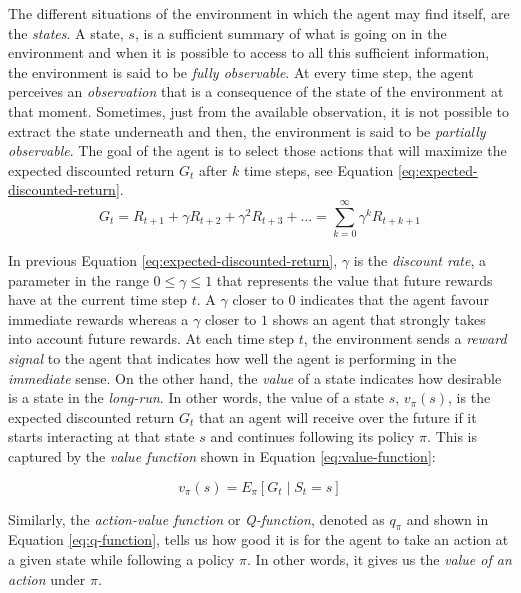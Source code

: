 The different situations of the environment in which the agent may find itself, are the \textit{states}. A state, $s$, is a sufficient summary of what is going on in the environment and when it is possible to access to all this sufficient information, the environment is said to be \textit{fully observable}. At every time step, the agent perceives an \textit{observation} that is a consequence of the state of the environment at that moment. Sometimes, just from the available observation, it is not possible to extract the state underneath and then, the environment is said to be \textit{partially observable}. The goal of the agent is to select those actions that will maximize the expected discounted return $G_t$ after $k$ time steps, see Equation \eqref{eq:expected-discounted-return}.
\begin{equation}
G_t = R_{t+1} + \gamma R_{t+2} + \gamma^2 R_{t+3} +... = \sum_{k=0}^{\infty} \gamma ^k R_{t+k+1}
\label{eq:expected-discounted-return}
\end{equation}

In previous Equation \eqref{eq:expected-discounted-return}, $\gamma$ is the \textit{discount rate}, a parameter in the range $0 \leq \gamma \leq 1$ that represents the value that future rewards have at the current time step $t$. A $\gamma$ closer to $0$ indicates that the agent favour immediate rewards whereas a $\gamma$ closer to $1$ shows an agent that strongly takes into account future rewards. At each time step $t$, the environment sends a \textit{reward signal} to the agent that indicates how well the agent is performing in the \textit{immediate} sense. On the other hand, the \textit{value} of a state indicates how desirable is a state in the \textit{long-run}. In other words, the value of a state $s$, $v_\pi \left(s\right) $, is the expected discounted return $G_t$ that an agent will receive over the future if it starts interacting at that state $s$ and continues following its policy $\pi$. This is captured by the \textit{value function} shown in Equation \eqref{eq:value-function}:






\begin{equation}
v_\pi \left(s\right) = E_\pi \left[G_{t}\mid S_{t}=s\right]
\label{eq:value-function}
\end{equation}



Similarly, the \textit{action-value function} or \textit{Q-function}, denoted as $q_\pi$ and shown in Equation \eqref{eq:q-function}, tells us how good it is for the agent to take an action at a given state while following a policy $\pi$. In other words, it gives us the \textit{value of an action} under $\pi$.

